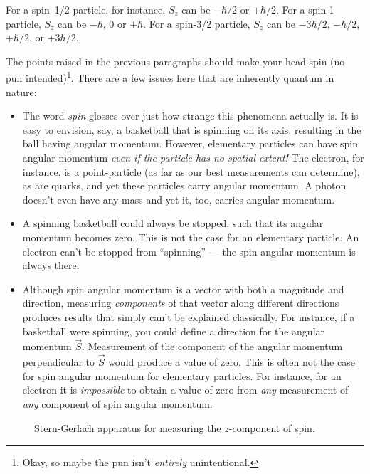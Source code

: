\noindent For a spin--1/2 particle, for instance, $S_z$ can be $-\hbar/2$
or $+\hbar/2$. For a spin-1 particle, $S_z$ can be $-\hbar$, 0 or
$+\hbar$. For a spin-3/2 particle, $S_z$ can be $-3\hbar/2$,
$-\hbar/2$, $+\hbar/2$, or $+3\hbar/2$.

The points raised in the previous paragraphs should make your head
spin (no pun intended)\footnote{Okay, so maybe the pun isn't {\it
entirely\/} unintentional.}.  There are a few issues here that are
inherently quantum in nature:

\begin{itemize}

\item[(1)] The word {\it spin} glosses over just how strange this
phenomena actually is.  It is easy to envision, say, a basketball that
is spinning on its axis, resulting in the ball having angular
momentum.  However, elementary particles can have spin angular
momentum {\it even if the particle has no spatial extent!}  The
electron, for instance, is a point-particle (as far as our 
best measurements can determine), as are quarks, and
yet these particles carry angular momentum.  A photon doesn't even
have any mass and yet it, too, carries angular momentum.

\item[(2)] A spinning basketball could always be stopped, such
that its angular momentum becomes zero.  This is not the case for
an elementary particle.  An electron can't be stopped from
``spinning'' --- the spin angular momentum is always there.

\item[(3)] Although spin angular momentum is a vector with both
a magnitude and direction, measuring {\it components\/} of that
vector along different directions produces results that simply
can't be explained classically.  For instance, if a basketball were
spinning, you could define a direction for the angular momentum
$\vec{S}$. Measurement of the component of the angular
momentum perpendicular to $\vec{S}$ would produce a
value of zero.  This is often not the case for spin angular
momentum for elementary particles.  For instance, for an electron 
it is {\it impossible} to obtain a value of zero from {\it any\/}
measurement of {\it any\/} component of spin angular momentum.

\end{itemize}

\begin{figure}
\begin{center}
\caption{Stern-Gerlach apparatus for measuring the $z$-component of spin.}
\label{fig:SGDevice}
\end{center}
\end{figure}

